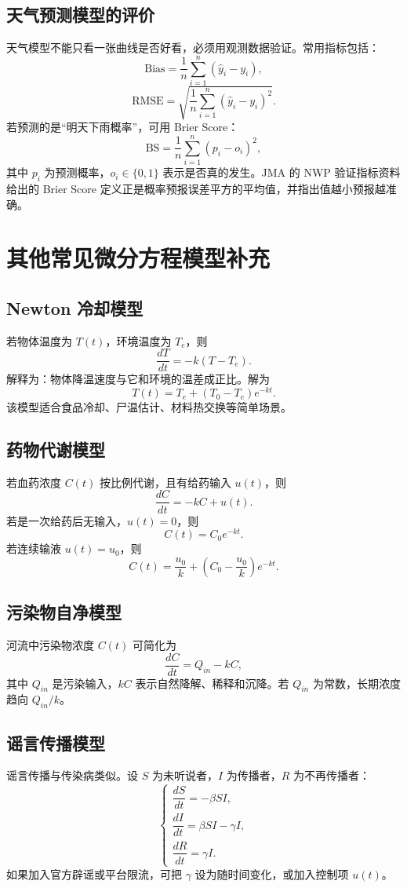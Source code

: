 \documentclass[11pt,a4paper]{ctexart}
\begin{document}
\subsection{天气预测模型的评价}
天气模型不能只看一张曲线是否好看，必须用观测数据验证。常用指标包括：
\[
\text{Bias}=\frac{1}{n}\sum_{i=1}^n(\hat y_i-y_i),
\]
\[
\text{RMSE}=\sqrt{\frac{1}{n}\sum_{i=1}^n(\hat y_i-y_i)^2}.
\]
若预测的是“明天下雨概率”，可用 Brier Score：
\[
\text{BS}=\frac{1}{n}\sum_{i=1}^n(p_i-o_i)^2,
\]
其中 $p_i$ 为预测概率，$o_i\in\{0,1\}$ 表示是否真的发生。JMA 的 NWP 验证指标资料给出的 Brier Score 定义正是概率预报误差平方的平均值，并指出值越小预报越准确。

\section{其他常见微分方程模型补充}

\subsection{Newton 冷却模型}
若物体温度为 $T(t)$，环境温度为 $T_e$，则
\[
\frac{dT}{dt}=-k(T-T_e).
\]
解释为：物体降温速度与它和环境的温差成正比。解为
\[
T(t)=T_e+(T_0-T_e)e^{-kt}.
\]
该模型适合食品冷却、尸温估计、材料热交换等简单场景。

\subsection{药物代谢模型}
若血药浓度 $C(t)$ 按比例代谢，且有给药输入 $u(t)$，则
\[
\frac{dC}{dt}=-kC+u(t).
\]
若是一次给药后无输入，$u(t)=0$，则
\[
C(t)=C_0e^{-kt}.
\]
若连续输液 $u(t)=u_0$，则
\[
C(t)=\frac{u_0}{k}+\left(C_0-\frac{u_0}{k}\right)e^{-kt}.
\]

\subsection{污染物自净模型}
河流中污染物浓度 $C(t)$ 可简化为
\[
\frac{dC}{dt}=Q_{in}-kC,
\]
其中 $Q_{in}$ 是污染输入，$kC$ 表示自然降解、稀释和沉降。若 $Q_{in}$ 为常数，长期浓度趋向 $Q_{in}/k$。

\subsection{谣言传播模型}
谣言传播与传染病类似。设 $S$ 为未听说者，$I$ 为传播者，$R$ 为不再传播者：
\[
\begin{cases}
\dfrac{dS}{dt}=-\beta SI,\\
\dfrac{dI}{dt}=\beta SI-\gamma I,\\
\dfrac{dR}{dt}=\gamma I.
\end{cases}
\]
如果加入官方辟谣或平台限流，可把 $\gamma$ 设为随时间变化，或加入控制项 $u(t)$。
\end{document}
